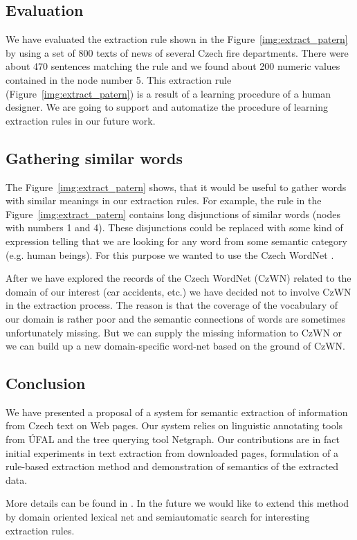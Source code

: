 \subsection{Evaluation}
We have evaluated the extraction rule shown in the Figure~\ref{img:extract_patern} by using a set of 800 texts of news of several Czech fire departments. There were about 470 sentences matching the rule and we found about 200 numeric values contained in the node number 5. This extraction rule (Figure~\ref{img:extract_patern}) is a result of a learning procedure of a human designer. We are going to support and automatize the procedure of learning extraction rules in our future work.

\subsection{Gathering similar words}

The Figure~\ref{img:extract_patern} shows, that it would be useful to gather words with similar meanings in our extraction rules. For example, the rule in the Figure~\ref{img:extract_patern} contains long disjunctions of similar words (nodes with numbers 1 and 4). These disjunctions could be replaced with some kind of expression telling that we are looking for any word from some semantic category (e.g. human beings). For this purpose we wanted to use the Czech WordNet \citep{biblio:WordNetCZ2004}. 

After we have explored the records of the Czech WordNet (CzWN) related to the domain of our interest (car accidents, etc.) we have decided not to involve CzWN in the extraction process. The reason is that the coverage of the vocabulary of our domain is rather poor and the semantic connections of words are sometimes unfortunately missing. But we can supply the missing information to CzWN or we can build up a new domain-specific word-net based on the ground of CzWN.  


\subsection{Conclusion}


We have presented a proposal of a system for semantic extraction of information from Czech text on Web pages. Our system relies on linguistic annotating tools from ÚFAL and the tree querying tool Netgraph. Our contributions are in fact initial experiments in text extraction from downloaded pages, formulation of a rule-based extraction method and demonstration of semantics of the extracted data.

More details can be found in \citealt{biblio:DedekSemAnot2007}. In the future we would like to extend this method by domain oriented lexical net and semiautomatic search for interesting extraction rules.
